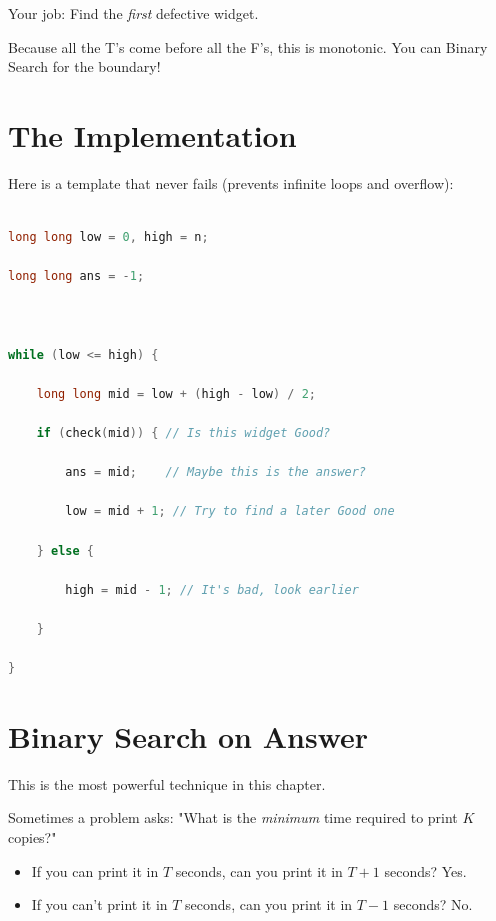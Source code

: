 \documentclass[12pt, a4paper]{report}
\begin{document}
Your job: Find the \textit{first} defective widget.

Because all the T's come before all the F's, this is monotonic. You can Binary Search for the boundary!



\section{The Implementation}

Here is a template that never fails (prevents infinite loops and overflow):

\begin{lstlisting}[language=C++]

long long low = 0, high = n;

long long ans = -1;



while (low <= high) {

    long long mid = low + (high - low) / 2;

    if (check(mid)) { // Is this widget Good?

        ans = mid;    // Maybe this is the answer?

        low = mid + 1; // Try to find a later Good one

    } else {

        high = mid - 1; // It's bad, look earlier

    }

}

\end{lstlisting}



\section{Binary Search on Answer}

This is the most powerful technique in this chapter.

Sometimes a problem asks: "What is the \textit{minimum} time required to print $K$ copies?"

\begin{itemize}

    \item If you can print it in $T$ seconds, can you print it in $T+1$ seconds? Yes.

    \item If you can't print it in $T$ seconds, can you print it in $T-1$ seconds? No.

\end{itemize}
\end{document}
